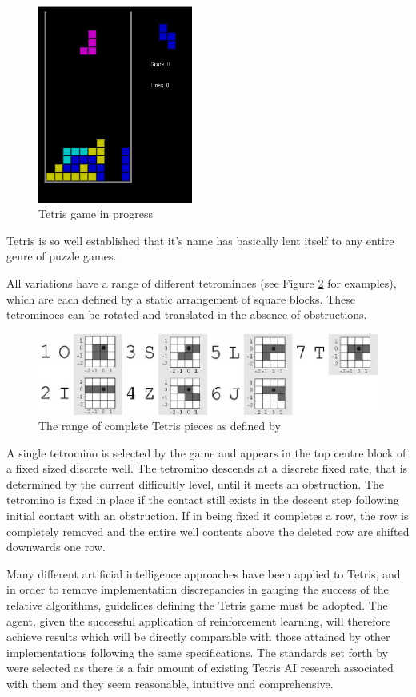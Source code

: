 \documentclass{rucsthesis}
\begin{document}
\begin{figure}[h]
\centering%
\includegraphics[width=2in]{tetgame.jpg}
\caption{Tetris game in progress}
\label{fig:tetgame}
\end{figure}

Tetris is so well established that it's name has basically lent itself to any entire genre of puzzle games.

 All variations have a range of different tetrominoes (see Figure \ref{fig:pieces} for examples), which are each defined by a static arrangement of square blocks. These tetrominoes can be rotated and translated in the absence of obstructions. 

\begin{figure}[h]
\centering
\includegraphics[width=\textwidth]{tetrisblocks.jpg}
\caption{The range of complete Tetris pieces as defined by \cite{tetstand}}
\label{fig:pieces}
\end{figure}
 
A  single tetromino is selected by the game and appears in the top centre block of a fixed sized discrete well. The tetromino descends at a discrete fixed rate, that is determined by the current difficultly level, until it meets an obstruction. The tetromino is fixed in place if the contact still exists in the descent step following initial contact with an obstruction. If in being fixed it completes a row, the row is completely removed and the entire well contents above the deleted row are shifted downwards one row.

Many different artificial intelligence approaches have been applied to Tetris, and in order to remove implementation discrepancies in gauging the success of the relative algorithms, guidelines defining the Tetris game must be adopted. The agent, given the successful application of reinforcement learning, will therefore achieve results which will be directly comparable with those attained by other implementations following the same specifications. The standards set forth by \cite{tetstand} were selected as there is a fair amount of existing Tetris AI research associated with them and they seem reasonable, intuitive and comprehensive.
\end{document}
